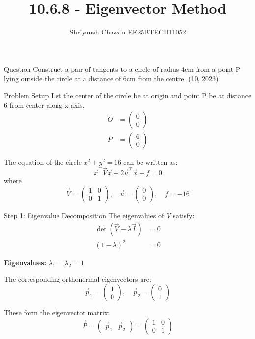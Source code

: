 \documentclass{beamer}
\title{10.6.8 - Eigenvector Method}
\author{Shriyansh Chawda-EE25BTECH11052}
\newcommand{\myvec}[1]{\ensuremath{\begin{pmatrix}#1\end{pmatrix}}}
\begin{document}
	
	\frame{\titlepage}
	
	\begin{frame}{Question} 
		Construct a pair of tangents to a circle of radius 4cm from a point P lying outside the circle at 
		a distance of 6cm from the centre.
		\hfill{(10, 2023)}\\
	\end{frame}
	
	\begin{frame}{Problem Setup}
		Let the center of the circle be at origin and point P be at distance 6 from center along x-axis.
		\begin{align}
			O &= \myvec{0\\0}\\
			P &= \myvec{6\\0}
		\end{align}
		
		The equation of the circle $x^2 + y^2 = 16$ can be written as:
		\begin{equation}
			\vec{x}^\top \vec{V} \vec{x} + 2\vec{u}^\top \vec{x} + f = 0
		\end{equation}
		where
		\begin{equation}
			\vec{V} = \myvec{1 & 0\\0 & 1}, \quad \vec{u} = \myvec{0\\0}, \quad f = -16
		\end{equation}
	\end{frame}
	
	\begin{frame}{Step 1: Eigenvalue Decomposition}
		The eigenvalues of $\vec{V}$ satisfy:
		\begin{align}
			\det(\vec{V} - \lambda\vec{I}) &= 0\\
			(1-\lambda)^2 &= 0
		\end{align}
		
		\textbf{Eigenvalues:} $\lambda_1 = \lambda_2 = 1$
		
		\vspace{1em}
		The corresponding orthonormal eigenvectors are:
		\begin{equation}
			\vec{p}_1 = \myvec{1\\0}, \quad \vec{p}_2 = \myvec{0\\1}
		\end{equation}
		
		These form the eigenvector matrix:
		\begin{equation}
			\vec{P} = \myvec{\vec{p}_1 & \vec{p}_2} = \myvec{1 & 0\\0 & 1}
		\end{equation}
	\end{frame}
	
\end{document}
